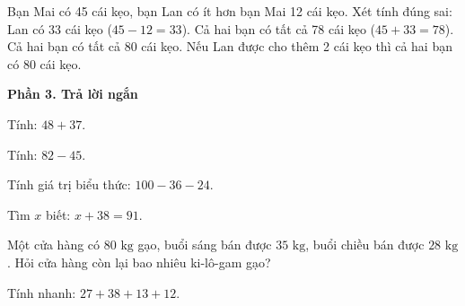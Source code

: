 \begin{ex} %
Bạn Mai có 45 cái kẹo, bạn Lan có ít hơn bạn Mai 12 cái kẹo. Xét tính đúng sai:
\choiceTF
{\True Lan có 33 cái kẹo ($45 - 12 = 33$).}
{\True Cả hai bạn có tất cả 78 cái kẹo ($45 + 33 = 78$).}
{Cả hai bạn có tất cả 80 cái kẹo.}
{\True Nếu Lan được cho thêm 2 cái kẹo thì cả hai bạn có 80 cái kẹo.}
\end{ex}

\textbf{Phần 3. Trả lời ngắn}

\begin{ex} %
Tính: $48 + 37$.
\end{ex}

\begin{ex} %
Tính: $82 - 45$.
\end{ex}

\begin{ex} %
Tính giá trị biểu thức: $100 - 36 - 24$.
\end{ex}

\begin{ex} %
Tìm $x$ biết: $x + 38 = 91$.
\end{ex}

\begin{ex} %
Một cửa hàng có $80\text{ kg}$ gạo, buổi sáng bán được $35\text{ kg}$, buổi chiều bán được $28\text{ kg}$. Hỏi cửa hàng còn lại bao nhiêu ki-lô-gam gạo?
\end{ex}

\begin{ex} %
Tính nhanh: $27 + 38 + 13 + 12$.
\end{ex}
